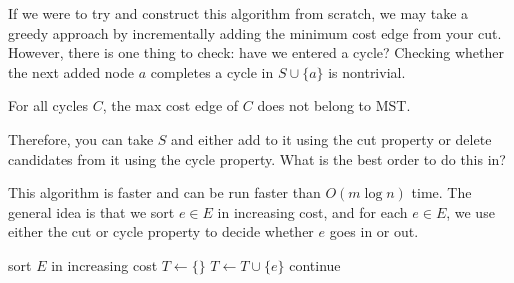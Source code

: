 \documentclass{article}
\begin{document}
      If we were to try and construct this algorithm from scratch, we may take a greedy approach by incrementally adding the minimum cost edge from your cut. However, there is one thing to check: have we entered a cycle? Checking whether the next added node $a$ completes a cycle in $S \cup \{a\}$ is nontrivial. 

      \begin{theorem}
        For all cycles $C$, the max cost edge of $C$ does not belong to MST. 
      \end{theorem}

      Therefore, you can take $S$ and either add to it using the cut property or delete candidates from it using the cycle property. What is the best order to do this in? 

      \begin{algo}
        This algorithm is faster and can be run faster than $O(m \log{n})$ time. The general idea is that we sort $e \in E$ in increasing cost, and for each $e \in E$, we use either the cut or cycle property to decide whether $e$ goes in or out. 

        \begin{algorithm}[H]
          \label{alg:prim_kruskal}
          \begin{algorithmic}[1]
              \State sort $E$ in increasing cost 
              \State $T \gets \{\}$
                  \State $T \gets T \cup \{e\}$ 
                \Else {} 
                  \State continue 
                \EndIf
              \EndFor
            \EndFunction
          \end{algorithmic}
        \end{algorithm}


\end{algo}
\end{document}
